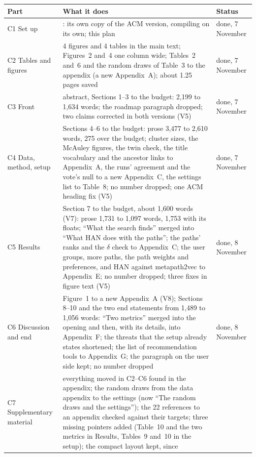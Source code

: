 \documentclass[11pt,a4paper]{article}
\DeclareRobustCommand{\code}[1]{\texttt{\detokenize{#1}}}
\begin{document}
{\small
\begin{tabularx}{\textwidth}{@{}>{\raggedright\arraybackslash}p{}L>{\raggedright\arraybackslash}p{0.15\textwidth}@{}}
  \toprule
  Part & What it does & Status \\
  \midrule
  C1 Set up & \code{paper_v2/}: its own copy of the ACM version, compiling on its own; this plan
    & done, 7 November \\
  C2 Tables and figures & 4 figures and 4 tables in the main text; Figures~2 and~4 one column
    wide; Tables~2 and~6 and the random draws of Table~3 to the appendix (a new Appendix~A);
    about 1.25 pages saved & done, 7 November \\
  C3 Front & abstract, Sections 1--3 to the budget: 2,199 to 1,634 words; the roadmap
    paragraph dropped; two claims corrected in both versions (V5) & done, 7 November \\
  C4 Data, method, setup & Sections 4--6 to the budget: prose 3,477 to 2,610 words, 275 over
    the budget; cluster sizes, the McAuley figures, the twin check, the title vocabulary and the
    ancestor links to Appendix~A, the runs' agreement and the vote's null to a new Appendix~C,
    the settings list to Table~8; no number dropped; one ACM heading fix (V5) & done,
    7 November \\
  C5 Results & Section 7 to the budget, about 1,600 words (V7): prose 1,731 to 1,097 words,
    1,753 with its floats; ``What the search finds'' merged into ``What HAN does with the paths'';
    the paths' ranks and the $\delta$ check to Appendix~C; the user groups, more paths, the path
    weights and preferences, and HAN against metapath2vec to Appendix~E; no number dropped; three
    fixes in figure text (V5) & done, 8 November \\
  C6 Discussion and end & Figure~1 to a new Appendix~A (V8); Sections 8--10 and the two end
    statements from 1,489 to 1,056 words: ``Two metrics'' merged into the opening and then, with
    its details, into Appendix~F; the threats that the setup already states shortened; the list of
    recommendation tools to Appendix~G; the paragraph on the user side kept; no number dropped
    & done, 8 November \\
  C7 Supplementary material & everything moved in C2--C6 found in the appendix; the random draws
    from the data appendix to the settings (now ``The random draws and the settings''); the 22
    references to an appendix checked against their targets; three missing pointers added (Table~10
    and the two metrics in Results, Tables~9 and~10 in the setup); the compact layout kept, since

\end{tabularx}}
\end{document}
